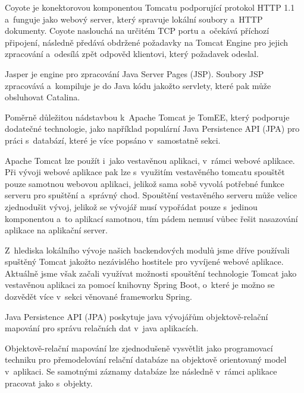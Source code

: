 \documentclass[12pt]{article}
\begin{document}
Coyote je konektorovou komponentou Tomcatu podporující protokol HTTP 1.1 
a~funguje jako webový server, který spravuje lokální soubory a~HTTP dokumenty.
Coyote naslouchá na určitém TCP portu a~očekává příchozí připojení,
následně předává obdržené požadavky na Tomcat Engine pro jejich zpracování
a~odesílá zpět odpověd klientovi, který požadavek odeslal.

Jasper je engine pro zpracování Java Server Pages (JSP).
Soubory JSP zpracovává a~kompiluje je do Java kódu jakožto servlety,
které pak může obsluhovat Catalina.


Poměrně důležitou nádstavbou k~Apache Tomcat je TomEE,
který podporuje dodatečné technologie,
jako například populární Java Persistence API (JPA) pro práci s~databází,
které je více popsáno v~samostatně sekci.

Apache Tomcat lze použít i~jako vestavěnou aplikaci, v~rámci webové aplikace.
Při vývoji webové aplikace pak lze s~využitím vestavěného tomcatu
spouštět pouze samotnou webovou aplikaci, jelikož sama sobě vyvolá
potřebné funkce serveru pro spuštění a~správný chod.
Spouštění vestavěného serveru může velice zjednodušit vývoj,
jelikož se vývojář musí vypořádat pouze s~jedinou komponentou a~to aplikací samotnou,
tím pádem nemusí vůbec řešit nasazování aplikace na aplikační server.


Z~hlediska lokálního vývoje našich backendových modulů jsme dříve používali 
spuštěný Tomcat jakožto nezávislého hostitele pro vyvíjené webové aplikace.
Aktuálně jsme však začali využívat možnosti spouštění technologie Tomcat jako vestavěnou
aplikaci za pomocí knihovny Spring Boot, o~které je možno se dozvědět více v~sekci
věnované frameworku Spring.

Java Persistence API (JPA) poskytuje java vývojářům
objektově-relační mapování pro správu relačních dat v~java aplikacích.

Objektově-relační mapování lze zjednodušeně vysvětlit jako
programovací techniku pro přemodelování relační databáze
na objektově orientovaný model v~aplikaci.
Se samotnými záznamy databáze lze následně v~rámci aplikace pracovat jako s~objekty.

\end{document}
